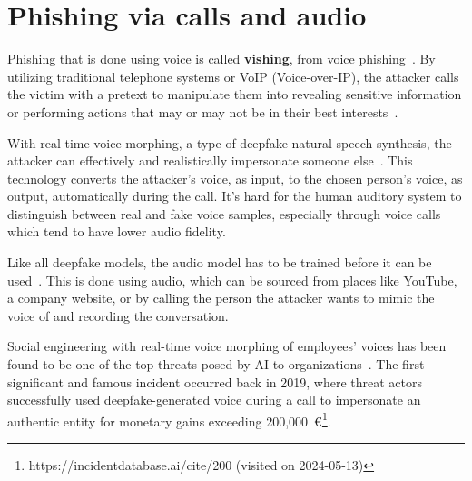 \section{Phishing via calls and audio}
\begin{comment}
\end{comment}

%
%
Phishing that is done using voice is called \textbf{vishing}, from voice phishing~\citep{doan_BTSE_Audio_Deepfake_Detection_2023}. By utilizing traditional telephone systems or VoIP (Voice-over-IP), the attacker calls the victim with a pretext to manipulate them into revealing sensitive information or performing actions that may or may not be in their best interests~\citep{hadnagy_Social_Engineering_The_Science_2018}.


%
%
With real-time voice morphing, a type of deepfake natural speech synthesis, the attacker can effectively and realistically impersonate someone else~\citep{doan_BTSE_Audio_Deepfake_Detection_2023}. This technology converts the attacker's voice, as input, to the chosen person's voice, as output, automatically during the call. It's hard for the human auditory system to distinguish between real and fake voice samples, especially through voice calls which tend to have lower audio fidelity.



%
%
Like all deepfake models, the audio model has to be trained before it can be used~\citep{doan_BTSE_Audio_Deepfake_Detection_2023}. This is done using audio, which can be sourced from places like YouTube, a company website, or by calling the person the attacker wants to mimic the voice of and recording the conversation.



%
%
Social engineering with real-time voice morphing of employees' voices has been found to be one of the top threats posed by AI to organizations~\citep{mirsky_Threat_Offensive_AI_Organizations_2023}. The first significant and famous incident occurred back in 2019, where threat actors successfully used deepfake-generated voice during a call to impersonate an authentic entity for monetary gains exceeding 200,000~€\footnote{https://incidentdatabase.ai/cite/200 (visited on 2024-05-13)}.
